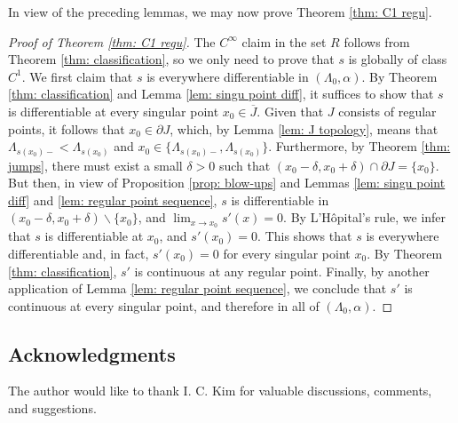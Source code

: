 \documentclass{article}
\numberwithin{equation}{section}
\numberwithin{figure}{section}
\theoremstyle{plain}
\theoremstyle{plain}
\theoremstyle{plain}
\theoremstyle{plain}
\theoremstyle{definition}
\theoremstyle{remark}
\begin{document}
In view of the preceding lemmas, we may now prove Theorem \ref{thm: C1 regu}.
\begin{proof}[Proof of Theorem \ref{thm: C1 regu}] The $C^{\infty}$ claim in the set $R$ follows from Theorem \ref{thm: classification}, so we only need to prove that $s$ is globally of class $C^1$. We first claim that $s$ is everywhere differentiable in $(\Lambda_0,\alpha)$. By Theorem \ref{thm: classification} and Lemma \ref{lem: singu point diff}, it suffices to show that $s$ is differentiable at every singular point $x_0\in \overline{J}$. Given that $J$ consists of regular points, it follows that $x_0\in \partial J$, which, by Lemma \ref{lem: J topology}, means that $\Lambda_{s(x_0)-}<\Lambda_{s(x_0)}$ and $x_0\in \{\Lambda_{s(x_0)-},\Lambda_{s(x_0)}\}$. Furthermore, by Theorem \ref{thm: jumps}, there must exist a small $\delta>0$ such that $(x_0-\delta,x_0+\delta) \cap \partial{J} =\{x_0\}$. But then, in view of Proposition \ref{prop: blow-ups} and Lemmas \ref{lem: singu point diff} and \ref{lem: regular point sequence}, $s$ is differentiable in $(x_0-\delta,x_0+\delta)\backslash\{x_0\}$, and $\lim_{x \to x_0} s'(x)=0$. By L'H\^opital's rule, we infer that $s$ is differentiable at $x_0$, and $s'(x_0)=0$. This shows that $s$ is everywhere differentiable and, in fact, $s'(x_0)=0$ for every singular point $x_0$. By Theorem \ref{thm: classification}, $s'$ is continuous at any regular point. Finally, by another application of Lemma \ref{lem: regular point sequence}, we conclude that $s'$ is continuous at every singular point, and therefore in all of $(\Lambda_0,\alpha)$.
\end{proof}
\subsection*{Acknowledgments}The author would like to thank I. C. Kim for valuable discussions, comments, and suggestions.
    
\end{document}
